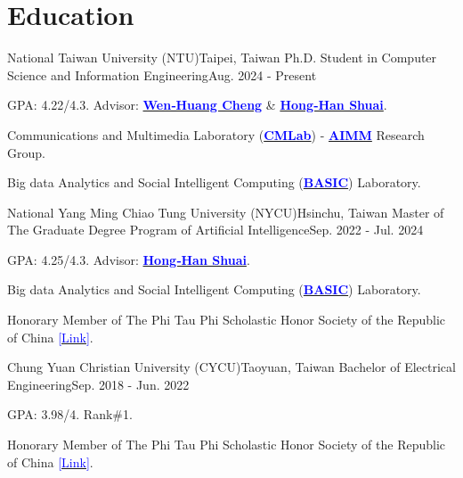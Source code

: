 \section{\textbf{Education}}
  \resumeSubHeadingListStart
  
    \resumeSubheading
      {National Taiwan University (NTU)}{Taipei, Taiwan}
      {Ph.D. Student in Computer Science and Information Engineering}{Aug. 2024 - Present}
      \vspace{-3mm}
      \resumeItemListStart
          \item GPA: 4.22/4.3. Advisor: \href{https://www.csie.ntu.edu.tw/~wenhuang/}{\textcolor{Blue}{\textbf{Wen‑Huang Cheng}}} \& \href{https://basiclab.lab.nycu.edu.tw/}{\textcolor{Blue}{\textbf{Hong‑Han Shuai}}}. 
          \item Communications and Multimedia Laboratory (\href{https://www.cmlab.csie.ntu.edu.tw/new_cml_website/index.php}{\textcolor{Blue}{\textbf{CMLab}}}) - \href{https://aimm.cmlab.csie.ntu.edu.tw/index.html}{\textcolor{Blue}{\textbf{AIMM}}} Research Group.
          \item Big data Analytics and Social Intelligent Computing (\href{https://basiclab.lab.nycu.edu.tw/new/index.html}{\textcolor{Blue}{\textbf{BASIC}}}) Laboratory.
        \resumeItemListEnd
      
      
    \resumeSubheading
      {National Yang Ming Chiao Tung University (NYCU)}{Hsinchu, Taiwan}
      {Master of The Graduate Degree Program of Artificial Intelligence}{Sep. 2022 - Jul. 2024}
      \vspace{-3mm}
      \resumeItemListStart
          \item GPA: 4.25/4.3. Advisor:   \href{https://basiclab.lab.nycu.edu.tw/}{\textcolor{Blue}  {\textbf{Hong‑Han Shuai}}}. 
          \item Big data Analytics and Social Intelligent Computing   (\href{https://basiclab.lab.nycu.edu.tw/new/index.html}  {\textcolor{Blue}{\textbf{BASIC}}}) Laboratory. 
          \item Honorary Member of The Phi Tau Phi Scholastic Honor   Society of the Republic of China   \href{https://leohuang0511.github.io/assets/certificates/a  cademic/NYCU_Phi_Tau_Phi.pdf}{\textcolor{Blue}{[Link]}}.
      \resumeItemListEnd


    \resumeSubheading
      {Chung Yuan Christian University (CYCU)}{Taoyuan, Taiwan}
      {Bachelor of Electrical Engineering}{Sep. 2018 - Jun. 2022}
      \vspace{-3mm}
      \resumeItemListStart
          \item GPA: 3.98/4. Rank\#1. 
          \item Honorary Member of The Phi Tau Phi Scholastic Honor Society of the Republic of China \href{https://leohuang0511.github.io/assets/certificates/academic/CYCU_Phi_Tau_Phi.pdf}{\textcolor{Blue}{[Link]}}.
      \resumeItemListEnd
  \resumeSubHeadingListEnd
